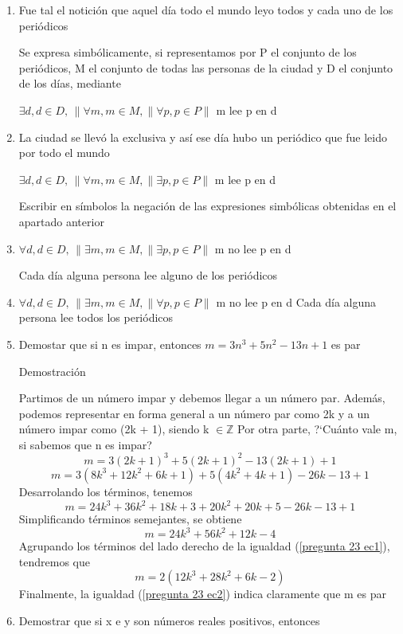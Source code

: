 \documentclass{article}
\begin{document}
\begin {enumerate}
Para cada entero n, con n mayor que 2 se verifica que para cada (x, y, z) que pertenece a $\mathbb{R}^3, x^n + y^n = z^n$ se verifica que xyz = 0.


Expresar en forma simbólica las expresiones escritas

\item
Fue tal el notición que aquel día todo el mundo leyo todos y cada uno de los periódicos

Se expresa simbólicamente, si representamos por P el conjunto de los periódicos, M el conjunto de todas las personas de la ciudad y D el conjunto de los días, mediante

$\exists d, d \in D, \, \| \forall m, m \in  M, \| \forall p, p \in  P \|$ m lee p en d

\item
La ciudad se llevó la exclusiva y así ese día hubo un periódico que fue leido por todo el mundo

$\exists d, d \in D, \, \| \forall m, m \in  M, \| \exists p, p \in  P \|$ m lee p en d

Escribir en símbolos la negación de las expresiones simbólicas obtenidas en el apartado anterior
\item
$\forall d, d \in D, \, \| \exists m, m \in  M, \| \exists p, p \in  P \|$ m no lee p en d

Cada día alguna persona lee alguno de los periódicos \
\item
$\forall d, d \in D, \, \| \exists m, m \in  M, \| \forall p, p \in  P \|$ m no lee p en d
Cada día alguna persona lee todos los periódicos

\item
Demostar que si n es impar, entonces $m = 3n^3 + 5n^2 - 13n + 1$ es par

Demostración

Partimos de un número impar y debemos llegar a un número par.  Además, podemos representar en forma general a un número par como 2k y a un número impar como (2k + 1), siendo k $\in \mathbb{Z}$
Por otra parte, ?`Cuánto vale m, si sabemos que n es impar?
$$
m = 3(2k + 1)^3 + 5(2k + 1)^2 - 13(2k + 1) + 1$$
$$m = 3(8k^3 + 12k^2 + 6k + 1) + 5(4k^2 + 4k + 1) - 26k - 13 + 1$$
Desarrolando los términos, tenemos
$$ m = 24k^3 + 36k^2 + 18k + 3 + 20k^2 + 20k + 5 - 26k - 13 + 1 $$
Simplificando términos semejantes, se obtiene
\begin {equation}
\label{pregunta 23 ec1}
m = 24k^3 + 56k^2 + 12k - 4
\end {equation}
Agrupando los términos del lado derecho de la igualdad (\ref{pregunta 23 ec1}), tendremos que 
\begin {equation}
\label{pregunta 23 ec2}
m = 2(12k^3 + 28k^2 + 6k - 2)
\end {equation}
Finalmente, la igualdad (\ref{pregunta 23 ec2}) indica claramente que m es par 
\item
Demostrar que si x e y son números reales positivos, entonces


\end{enumerate}
\end{document}
